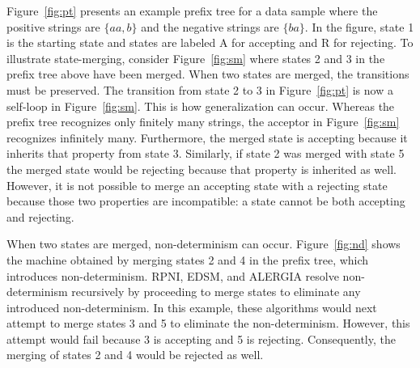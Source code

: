 \documentclass[twoside,11pt]{article}
\begin{document}




Figure~\ref{fig:pt} presents an example prefix tree for a data sample where the positive strings are $\{aa,b\}$ and the negative strings are $\{ba\}$. In the figure, state 1 is the starting state and states are labeled A for accepting and R for rejecting.
To illustrate state-merging, consider Figure~\ref{fig:sm} where states 2 and 3 in the prefix tree above have been merged.
When two states are merged, the transitions must be preserved. The transition from state 2 to 3 in Figure~\ref{fig:pt} is now a self-loop in Figure~\ref{fig:sm}.
This is how generalization can occur.
Whereas the prefix tree recognizes only finitely many strings, the acceptor in Figure~\ref{fig:sm} recognizes infinitely many.
Furthermore, the merged state is accepting because it inherits that property from state 3.
Similarly, if state 2 was merged with state 5 the merged state would be rejecting because that property is inherited as well.
However, it is not possible to merge an accepting state with a rejecting state because those two properties are incompatible: a state cannot be both accepting and rejecting.

When two states are merged, non-determinism can occur.
Figure~\ref{fig:nd} shows the machine obtained by merging states 2 and 4 in the prefix tree, which introduces non-determinism.
RPNI, EDSM, and ALERGIA resolve non-determinism recursively by proceeding to merge states to eliminate any introduced non-determinism.
In this example, these algorithms would next attempt to merge states 3 and 5 to eliminate the non-determinism.
However, this attempt would fail because 3 is accepting and 5 is rejecting.
Consequently, the merging of states 2 and 4 would be rejected as well.
\end{document}
